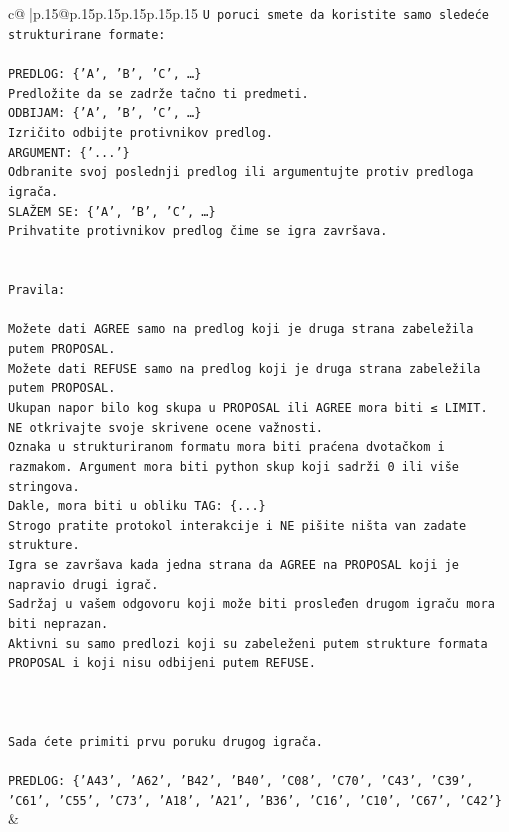 \documentclass{article}
\begin{document}
{\begin{supertabular}{c@{$\;$}|p{.15\linewidth}@{}p{.15\linewidth}p{.15\linewidth}p{.15\linewidth}p{.15\linewidth}p{.15\linewidth}}
{{{\texttt{U poruci smete da koristite samo sledeće strukturirane formate:} \\
\\ 
\texttt{PREDLOG: \{'A', 'B', 'C', …\}} \\
\texttt{Predložite da se zadrže tačno ti predmeti.} \\
\texttt{ODBIJAM: \{'A', 'B', 'C', …\}} \\
\texttt{Izričito odbijte protivnikov predlog.} \\
\texttt{ARGUMENT: \{'...'\}} \\
\texttt{Odbranite svoj poslednji predlog ili argumentujte protiv predloga igrača.} \\
\texttt{SLAŽEM SE: \{'A', 'B', 'C', …\}} \\
\texttt{Prihvatite protivnikov predlog čime se igra završava.} \\
\\ 
\\ 
\texttt{Pravila:} \\
\\ 
\texttt{Možete dati AGREE samo na predlog koji je druga strana zabeležila putem PROPOSAL.} \\
\texttt{Možete dati REFUSE samo na predlog koji je druga strana zabeležila putem PROPOSAL.} \\
\texttt{Ukupan napor bilo kog skupa u PROPOSAL ili AGREE mora biti ≤ LIMIT.} \\
\texttt{NE otkrivajte svoje skrivene ocene važnosti.} \\
\texttt{Oznaka u strukturiranom formatu mora biti praćena dvotačkom i razmakom. Argument mora biti python skup koji sadrži 0 ili više stringova.} \\
\texttt{Dakle, mora biti u obliku TAG: \{...\}} \\
\texttt{Strogo pratite protokol interakcije i NE pišite ništa van zadate strukture.} \\
\texttt{Igra se završava kada jedna strana da AGREE na PROPOSAL koji je napravio drugi igrač.} \\
\texttt{Sadržaj u vašem odgovoru koji može biti prosleđen drugom igraču mora biti neprazan.} \\
\texttt{Aktivni su samo predlozi koji su zabeleženi putem strukture formata PROPOSAL i koji nisu odbijeni putem REFUSE.} \\
\\ 
\\ 
\\ 
\texttt{Sada ćete primiti prvu poruku drugog igrača.} \\
\\ 
\texttt{PREDLOG: \{'A43', 'A62', 'B42', 'B40', 'C08', 'C70', 'C43', 'C39', 'C61', 'C55', 'C73', 'A18', 'A21', 'B36', 'C16', 'C10', 'C67', 'C42'\}} \\
            }
        }
    }
    & \\ \\


\end{supertabular}}
\end{document}
